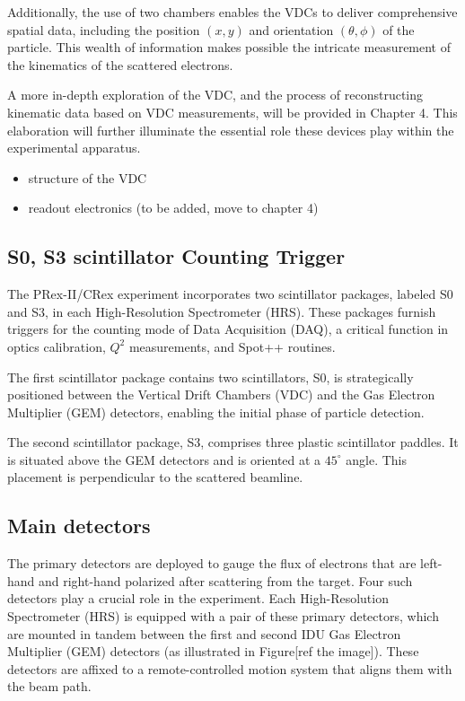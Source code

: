 Additionally, the use of two chambers enables the VDCs to deliver comprehensive spatial data, including the position $(x,y)$ and orientation $(\theta, \phi)$ of the particle. This wealth of information makes possible the intricate measurement of the kinematics of the scattered electrons.

A more in-depth exploration of the VDC, and the process of reconstructing kinematic data based on VDC measurements, will be provided in Chapter 4. This elaboration will further illuminate the essential role these devices play within the experimental apparatus.

\begin{itemize}
    \item structure of the VDC 
    \item readout electronics (to be added, move to chapter 4)
\end{itemize}

\subsection{S0, S3 scintillator Counting Trigger}

The PRex-II/CRex experiment incorporates two scintillator packages, labeled S0 and S3, in each High-Resolution Spectrometer (HRS). These packages furnish triggers for the counting mode of Data Acquisition (DAQ), a critical function in optics calibration, $Q^2$ measurements, and Spot++ routines.

The first scintillator package contains two scintillators, S0, is strategically positioned between the Vertical Drift Chambers (VDC) and the Gas Electron Multiplier (GEM) detectors, enabling the initial phase of particle detection.

The second scintillator package, S3, comprises three plastic scintillator paddles. It is situated above the GEM detectors and is oriented at a $45^\circ$ angle. This placement is perpendicular to the scattered beamline. 


\subsection{Main detectors}

The primary detectors are deployed to gauge the flux of electrons that are left-hand and right-hand polarized after scattering from the target. Four such detectors play a crucial role in the experiment. Each High-Resolution Spectrometer (HRS) is equipped with a pair of these primary detectors, which are mounted in tandem between the first and second IDU Gas Electron Multiplier (GEM) detectors (as illustrated in Figure[ref the image]). These detectors are affixed to a remote-controlled motion system that aligns them with the beam path.


